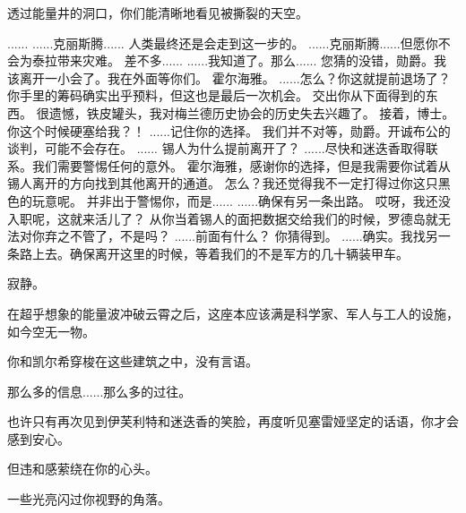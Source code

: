 \documentclass[openany]{book}
\begin{document}
透过能量井的洞口，你们能清晰地看见被撕裂的天空。

\begin{dialogue}
     ......
     ......克丽斯腾......
     人类最终还是会走到这一步的。
     ......克丽斯腾......但愿你不会为泰拉带来灾难。
     差不多......
     ......我知道了。那么......
     您猜的没错，勋爵。我该离开一小会了。我在外面等你们。
     霍尔海雅。
     ......怎么？你这就提前退场了？
     你手里的筹码确实出乎预料，但这也是最后一次机会。
     交出你从下面得到的东西。
     很遗憾，铁皮罐头，我对梅兰德历史协会的历史失去兴趣了。
     接着，博士。
     你这个时候硬塞给我？！
     ......记住你的选择。
     我们并不对等，勋爵。开诚布公的谈判，可能不会存在。
     ......
     锡人为什么提前离开了？
     ......尽快和迷迭香取得联系。我们需要警惕任何的意外。
     霍尔海雅，感谢你的选择，但是我需要你试着从锡人离开的方向找到其他离开的通道。
     怎么？我还觉得我不一定打得过你这只黑色的玩意呢。
     并非出于警惕你，而是......
     ......确保有另一条出路。
     哎呀，我还没入职呢，这就来活儿了？
     从你当着锡人的面把数据交给我们的时候，罗德岛就无法对你弃之不管了，不是吗？
     ......前面有什么？
     你猜得到。
     ......确实。我找另一条路上去。确保离开这里的时候，等着我们的不是军方的几十辆装甲车。
\end{dialogue}\par

寂静。\par
在超乎想象的能量波冲破云霄之后，这座本应该满是科学家、军人与工人的设施，如今空无一物。\par
你和凯尔希穿梭在这些建筑之中，没有言语。\par
那么多的信息......那么多的过往。\par
也许只有再次见到伊芙利特和迷迭香的笑脸，再度听见塞雷娅坚定的话语，你才会感到安心。\par
但违和感萦绕在你的心头。\par
一些光亮闪过你视野的角落。
\end{document}
